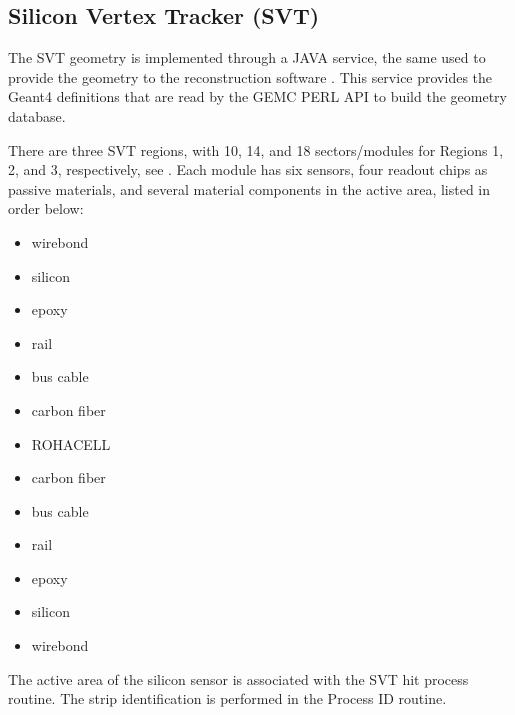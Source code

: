 \subsection{Silicon Vertex Tracker (SVT)}

The SVT \cite{svt-nim} geometry is implemented through a JAVA service, the same used to provide the geometry
to the reconstruction software \cite{recon-nim}.
This service provides the Geant4 definitions that are read by the GEMC PERL API to build the geometry database.

There are three SVT regions, with 10, 14, and 18 sectors/modules for Regions 1, 2, and 3, respectively, see .
Each module has six sensors, four readout chips as passive materials, and several material
components in the active area, listed in order below:

\begin{itemize}
	\item wirebond
	\item silicon
	\item epoxy
	\item rail
	\item bus cable
	\item carbon fiber
	\item ROHACELL
	\item carbon fiber
	\item bus cable
	\item rail
	\item epoxy
	\item silicon
	\item wirebond
\end{itemize}

The active area of the silicon sensor is associated with the SVT hit process routine.
The strip identification is performed in the Process ID routine.


